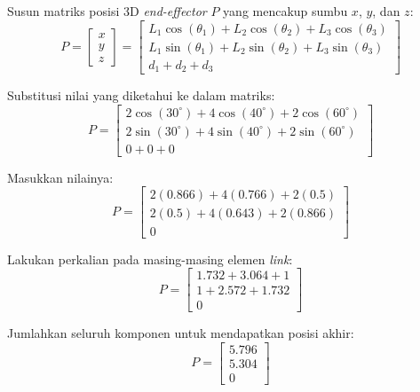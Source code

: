 \documentclass[12pt, a4paper, bahasa]{article}
\begin{document}
Susun matriks posisi 3D \textit{end-effector} $P$ yang mencakup sumbu $x$, $y$, dan $z$:
\begin{equation}
P = \begin{bmatrix} x \\ y \\ z \end{bmatrix} = 
\begin{bmatrix} 
L_1 \cos(\theta_1) + L_2 \cos(\theta_2) + L_3 \cos(\theta_3) \\ 
L_1 \sin(\theta_1) + L_2 \sin(\theta_2) + L_3 \sin(\theta_3) \\
d_1 + d_2 + d_3
\end{bmatrix}
\end{equation}

Substitusi nilai yang diketahui ke dalam matriks:
\begin{equation}
P = \begin{bmatrix} 
2 \cos(30^\circ) + 4 \cos(40^\circ) + 2 \cos(60^\circ) \\ 
2 \sin(30^\circ) + 4 \sin(40^\circ) + 2 \sin(60^\circ) \\
0 + 0 + 0
\end{bmatrix}
\end{equation}

Masukkan nilainya:
\begin{equation}
P = \begin{bmatrix} 
2(0.866) + 4(0.766) + 2(0.5) \\ 
2(0.5) + 4(0.643) + 2(0.866) \\
0
\end{bmatrix}
\end{equation}

Lakukan perkalian pada masing-masing elemen \textit{link}:
\begin{equation}
P = \begin{bmatrix} 
1.732 + 3.064 + 1 \\ 
1 + 2.572 + 1.732 \\
0
\end{bmatrix}
\end{equation}

Jumlahkan seluruh komponen untuk mendapatkan posisi akhir:
\begin{equation}
P = \begin{bmatrix} 
5.796 \\ 
5.304 \\
0
\end{bmatrix}
\end{equation}
\end{document}
